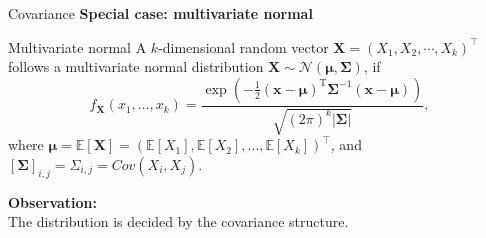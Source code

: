 \documentclass [aspectratio=169]{beamer}
\begin{document}
\begin{frame}{Covariance}
    \textbf{Special case: multivariate normal}\\
    \begin{block}{Multivariate normal}
    A $k$-dimensional random vector $\mathbf{X} = (X_1, X_2, \cdots, X_k)^\top$ follows a multivariate normal distribution $\mathbf{X} \sim \mathcal{N}(\boldsymbol{\mu}, \boldsymbol{\Sigma})$, if
    $$
f_{\mathbf {X} }(x_{1},\ldots ,x_{k})={\frac {\exp \left(-{\frac {1}{2}}({\mathbf {x} }-{\boldsymbol {\mu }})^{\mathrm {T} }{\boldsymbol {\Sigma }}^{-1}({\mathbf {x} }-{\boldsymbol {\mu }})\right)}{\sqrt {(2\pi )^{k}|{\boldsymbol {\Sigma }}|}}},
    $$
    where ${\boldsymbol {\mu }}=\mathbb{E} [\mathbf {X} ]=(\mathbb{E} [X_{1}],\mathbb{E}[X_{2}],\ldots ,\mathbb{E} [X_{k}])^\top$, and $[\boldsymbol{\Sigma}]_{i,j} = \Sigma_{i,j} = Cov(X_i, X_j)$.
    \end{block}
    \vspace{0.1in}
  \textbf{Observation:}\\
  The distribution is decided by the covariance structure. 
\end{frame}
\end{document}
